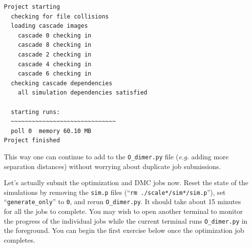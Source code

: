 \begin{shaded}
\begin{verbatim}
Project starting 
  checking for file collisions 
  loading cascade images 
    cascade 0 checking in 
    cascade 8 checking in 
    cascade 2 checking in 
    cascade 4 checking in 
    cascade 6 checking in 
  checking cascade dependencies 
    all simulation dependencies satisfied 
  
  starting runs:
  ~~~~~~~~~~~~~~~~~~~~~~~~~~~~~~ 
  poll 0  memory 60.10 MB 
Project finished
\end{verbatim}
\end{shaded}
\noindent
This way one can continue to add to the \texttt{O\_dimer.py} file (\emph{e.g.} adding more separation distances) without worrying about duplicate job submissions.

Let's actually submit the optimization and DMC jobs now.  Reset the state of the simulations by removing the \texttt{sim.p} files (``\texttt{rm ./scale*/sim*/sim.p}''), set ``\texttt{generate\_only}'' to \texttt{0}, and rerun \texttt{O\_dimer.py}.  It should take about 15 minutes for all the jobs to complete.  You may wish to open another terminal to monitor the progress of the individual jobs while the current terminal runs \texttt{O\_dimer.py} in the foreground.  You can begin the first exercise below once the optimization job completes.

